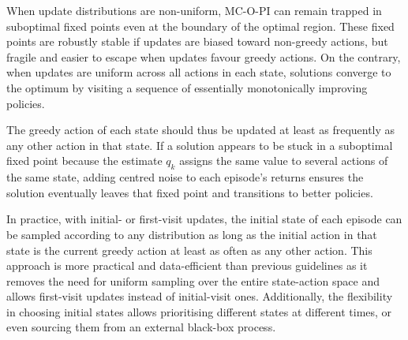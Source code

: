 





When update distributions are non-uniform,
MC-O-PI can remain trapped in suboptimal fixed points even at the boundary of the optimal region.
These fixed points are robustly stable if updates are biased toward non-greedy actions, but fragile and easier to escape when updates favour greedy actions.
On the contrary, when updates are uniform across all actions in each state, solutions converge to the optimum by visiting a sequence of essentially monotonically improving policies.


The greedy action of each state should thus be updated at least as frequently as any other action in that state.
If a solution appears to be stuck in a suboptimal fixed point because the estimate $q_k$ assigns the same value to several actions of the same state, adding centred noise to each episode's returns ensures the solution eventually leaves that fixed point and transitions to better policies.


In practice, with initial- or first-visit updates, the initial state of each episode can be sampled according to any distribution as long as the initial action in that state is the current greedy action at least as often as any other action.
This approach is more practical and data-efficient than previous guidelines as it removes the need for uniform sampling over the entire state-action space and allows first-visit updates instead of initial-visit ones.
Additionally, the flexibility in choosing initial states allows prioritising different states at different times,
or even sourcing them from an external black-box process.



